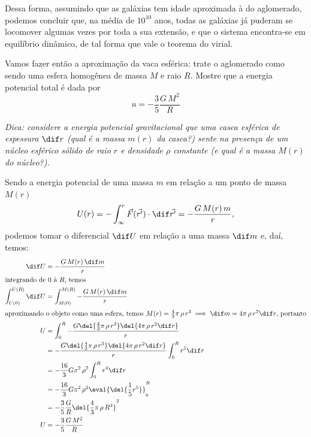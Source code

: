 \documentclass[]{IMTexam}
\begin{document}
\begin{questions}
\begin{unindent}[start=0]
\begin{solution}
			Dessa forma, assumindo que as galáxias tem idade aproximada à do aglomerado, podemos concluir que, na média de $ 10^{10} $ anos, todas as galáxias já puderam se locomover algumas vezes por toda a sua extensão, e que o sistema encontra-se em equilíbrio dinâmico, de tal forma que vale o teorema do virial.
		\end{solution}

		\item Vamos fazer então a aproximação da vaca esférica: trate o aglomerado como sendo uma esfera homogênea de massa $ M $ e raio $ R $. Mostre que a energia potencial total é dada por
		\[ u=-\dfrac{3}{5}\dfrac{G\,M^{2}}{R} \]

		\textit{Dica: considere a energia potencial gravitacional que uma casca esférica de espessura $ \dif r $ (qual é a massa $ m(r) $ da casca?) sente na presença de um núcleo esférico sólido de raio $ r $ e densidade $\rho$ constante (e qual é a massa $ M(r) $ do núcleo?).}

		\begin{solution}
			Sendo a energia potencial de uma massa $ m $ em relação a um ponto de massa $ M(r) $
			\[ U(r)=-\int_\infty^{r}\vec{F}(\vec{r'})\cdot\dif\vec{r'}=-\dfrac{G\,M(r)\,m}{r}, \]
			podemos tomar o diferencial $ \dif U $ em relação a uma massa $ \dif m $ e, daí, temos:
			\begin{align*}
				\dif U                   & =-\dfrac{G\,M(r)\,\dif m}{r}                                                                        \\
				\intertext{integrando de $ 0 $ à $ R $, temos}
				\int_{U(0)}^{U(R)}\dif U & =\int_{M(0)}^{M(R)}-\dfrac{G\,M(r)\,\dif m}{r}                                                      \\
				\intertext{aproximando o objeto como uma esfera, temos $ M(r)=\frac{4}{3}\pi\,\rho\,r^{3}\implies \dif m=4\pi\,\rho\,r^{2}\dif r $, portanto}
				U                        & =\int_{0}^{R}-\dfrac{G\del{\frac{4}{3}\pi\,\rho\,r^{3}}\del{4\pi\,\rho\,r^{2}\dif r}}{r}            \\
				                         & =-\dfrac{G\del{\frac{4}{3}\pi\,\rho\,r^{3}}\del{4\pi\,\rho\,r^{2}\dif r}}{r}\int_{0}^{R}r^{5}\dif r \\
				                         & =-\dfrac{16}{3}G\pi^{2}\,\rho^{2}\int_{0}^{R}r^{4}\dif r                                            \\
				                         & =-\dfrac{16}{3}G\pi^{2}\,\rho^{2}\eval{\del{\dfrac{1}{5}r^{5}}}_0^{R}                               \\
				                         & =-\dfrac{3}{5}\dfrac{G}{R}\del{\dfrac{4}{3}\pi\,\rho\,R^{3}}^{2}                                    \\
				U                        & =-\dfrac{3}{5}\dfrac{G\,M^{2}}{R}
			\end{align*}


\end{solution}
\end{unindent}
\end{questions}
\end{document}
